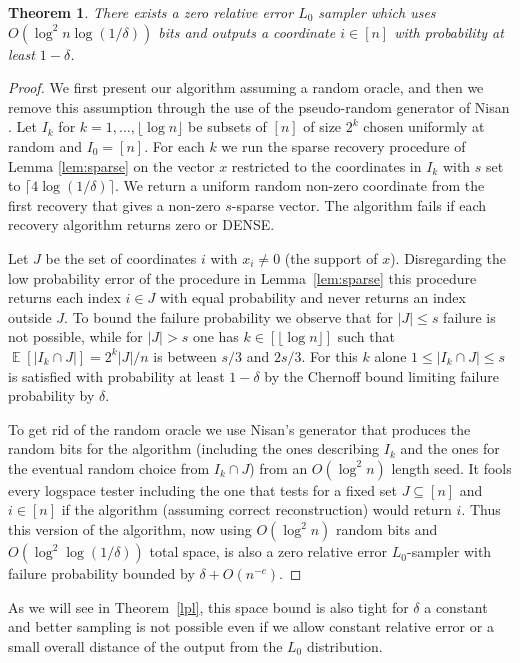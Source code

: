\documentclass[9pt,letterpaper]{article}
\newtheorem{theorem}{Theorem}
\theoremstyle{remark}
\DeclareMathOperator*{\E}{\mathbb{E}}
\begin{document}
\begin{theorem}\label{l0}
There exists a zero relative error $L_0$ sampler which
 uses $O(\log^2 n\log(1/\delta))$ bits and outputs a 
 coordinate $i\in[n]$ with probability at least $1-\delta$.
\end{theorem}
\begin{proof} We first present our algorithm assuming a random oracle, and
  then we remove this assumption through the use of the pseudo-random
  generator of Nisan \cite{Nisan}. Let $I_k$ for $k=1,\ldots,\lfloor\log
  n\rfloor$ be subsets of $[n]$ of size $2^k$ chosen uniformly at random and
  $I_0=[n]$. For each
  $k$ we run the sparse recovery procedure of
  Lemma \ref{lem:sparse} on the vector $x$ restricted to the coordinates in
  $I_k$ with $s$ set to $\lceil4\log(1/\delta)\rceil$. We return a uniform
  random non-zero coordinate from the first recovery that gives a non-zero
  $s$-sparse vector. The algorithm fails if each recovery algorithm returns
  zero or DENSE.

  Let $J$ be the set of coordinates $i$ with $x_i\ne0$ (the support of $x$).
  Disregarding the low probability error of the procedure in
  Lemma~\ref{lem:sparse} this procedure returns each index $i\in J$ with equal
  probability and never returns an index outside $J$. To bound the failure
  probability we observe that for $|J|\le s$ failure is not possible, while for
  $|J|>s$ one has $k\in[\lfloor\log n\rfloor]$ such that $\E[|I_k\cap
  J|]=2^k|J|/n$ is between $s/3$ and $2s/3$. For this $k$ alone $1\le|I_k\cap
  J|\le s$ is satisfied with probability at least $1-\delta$ by the Chernoff
  bound limiting failure probability by $\delta$.

  To get rid of the random oracle we use Nisan's generator \cite{Nisan} that
  produces the random bits for the algorithm (including the ones describing
  $I_k$ and the ones for the eventual random choice from $I_k\cap J$) from an
  $O(\log^2 n)$ length seed. It fools every logspace tester including the one
  that tests for a fixed set $J\subseteq[n]$ and $i\in[n]$ if the algorithm
  (assuming correct reconstruction) would return $i$. Thus this version of the
  algorithm, now using $O(\log^2n)$ random bits and $O(\log^2\log(1/\delta))$
  total space, is also a zero relative error $L_0$-sampler with failure
  probability bounded by $\delta+O(n^{-c})$.
\end{proof}

As we will see in Theorem~\ref{lpl}, this space bound is also tight for
$\delta$ a constant and better sampling is not possible even if we allow
constant relative error or a small overall distance of the output from the
$L_0$ distribution.
\end{document}
